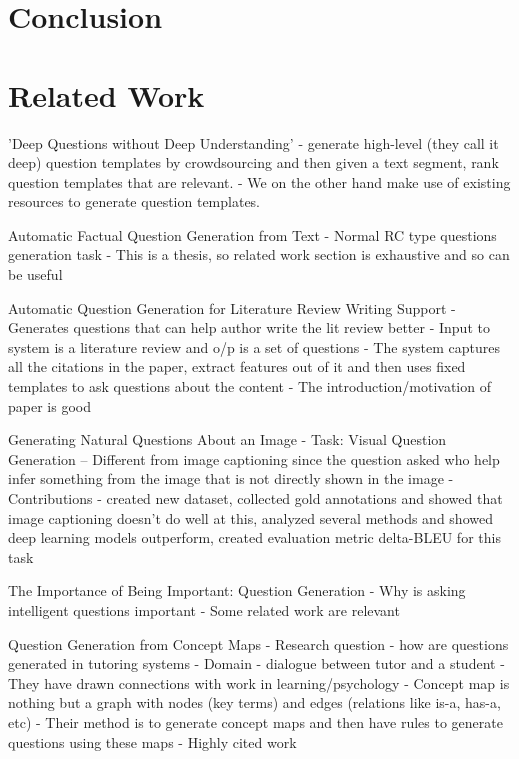 \documentclass[11pt]{article}
\begin{document}
\section{Conclusion}


\iffalse

\section{Related Work} \label{related_work}

'Deep Questions without Deep Understanding' 
- generate high-level (they call it deep) question templates by crowdsourcing and then given a text segment, rank question templates that are relevant. 
- We on the other hand make use of existing resources to generate question templates. 

Automatic Factual Question Generation from Text 
- Normal RC type questions generation task
- This is a thesis, so related work section is exhaustive and so can be useful

Automatic Question Generation for Literature Review Writing Support
- Generates questions that can help author write the lit review better
- Input to system is a literature review and o/p is a set of questions
- The system captures all the citations in the paper, extract features out of it and then uses fixed templates to ask questions about the content
- The introduction/motivation of paper is good
						
Generating Natural Questions About an Image 
- Task: Visual Question Generation -- Different from image captioning since the question asked who help infer something from the image that is not directly shown in the image
- Contributions - created new dataset, collected gold annotations and showed that image captioning doesn't do well at this, analyzed several methods and showed deep learning models outperform, created evaluation metric delta-BLEU for this task
			
The Importance of Being Important: Question Generation 
- Why is asking intelligent questions important
- Some related work are relevant

Question Generation from Concept Maps
- Research question - how are questions generated in tutoring systems
- Domain - dialogue between tutor and a student
- They have drawn connections with work in learning/psychology
- Concept map is nothing but a graph with nodes (key terms) and edges (relations like is-a, has-a, etc)
- Their method is to generate concept maps and then have rules to generate questions using these maps
- Highly cited work
\end{document}
